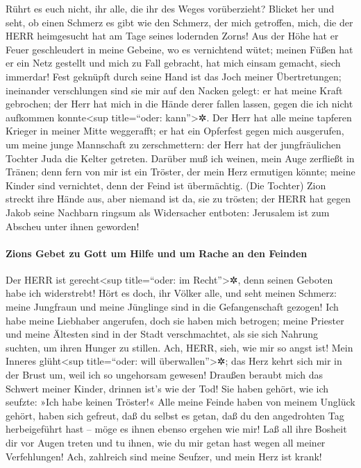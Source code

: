 Rührt es euch nicht, ihr alle, die ihr des Weges
vorüberzieht? Blicket her und seht, ob einen Schmerz es gibt wie den
Schmerz, der mich getroffen, mich, die der HERR heimgesucht hat am Tage
seines lodernden Zorns! Aus der Höhe hat er Feuer
geschleudert in meine Gebeine, wo es vernichtend wütet; meinen Füßen hat
er ein Netz gestellt und mich zu Fall gebracht, hat mich einsam gemacht,
siech immerdar! Fest geknüpft durch seine Hand ist das
Joch meiner Übertretungen; ineinander verschlungen sind sie mir auf den
Nacken gelegt: er hat meine Kraft gebrochen; der Herr hat mich in die
Hände derer fallen lassen, gegen die ich nicht aufkommen
konnte\textless sup title=``oder: kann''\textgreater✲.
Der Herr hat alle meine tapferen Krieger in meiner Mitte
weggerafft; er hat ein Opferfest gegen mich ausgerufen, um meine junge
Mannschaft zu zerschmettern: der Herr hat der jungfräulichen Tochter
Juda die Kelter getreten. Darüber muß ich weinen, mein
Auge zerfließt in Tränen; denn fern von mir ist ein Tröster, der mein
Herz ermutigen könnte; meine Kinder sind vernichtet, denn der Feind ist
übermächtig. (Die Tochter) Zion streckt ihre Hände aus,
aber niemand ist da, sie zu trösten; der HERR hat gegen Jakob seine
Nachbarn ringsum als Widersacher entboten: Jerusalem ist zum Abscheu
unter ihnen geworden!

\hypertarget{zions-gebet-zu-gott-um-hilfe-und-um-rache-an-den-feinden}{%
\paragraph{Zions Gebet zu Gott um Hilfe und um Rache an den
Feinden}\label{zions-gebet-zu-gott-um-hilfe-und-um-rache-an-den-feinden}}

Der HERR ist gerecht\textless sup title=``oder: im
Recht''\textgreater✲, denn seinen Geboten habe ich widerstrebt! Hört es
doch, ihr Völker alle, und seht meinen Schmerz: meine Jungfraun und
meine Jünglinge sind in die Gefangenschaft gezogen! Ich
habe meine Liebhaber angerufen, doch sie haben mich betrogen; meine
Priester und meine Ältesten sind in der Stadt verschmachtet, als sie
sich Nahrung suchten, um ihren Hunger zu stillen. Ach,
HERR, sieh, wie mir so angst ist! Mein Inneres glüht\textless sup
title=``oder: will überwallen''\textgreater✲; das Herz kehrt sich mir in
der Brust um, weil ich so ungehorsam gewesen! Draußen beraubt mich das
Schwert meiner Kinder, drinnen ist's wie der Tod! Sie
haben gehört, wie ich seufzte: »Ich habe keinen Tröster!« Alle meine
Feinde haben von meinem Unglück gehört, haben sich gefreut, daß du
selbst es getan, daß du den angedrohten Tag herbeigeführt hast -- möge
es ihnen ebenso ergehen wie mir! Laß all ihre Bosheit dir
vor Augen treten und tu ihnen, wie du mir getan hast wegen all meiner
Verfehlungen! Ach, zahlreich sind meine Seufzer, und mein Herz ist
krank!


